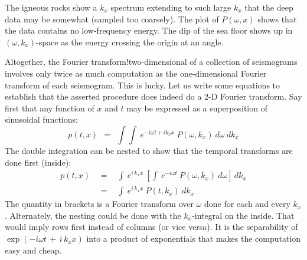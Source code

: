 The igneous rocks show a  $k_x$  spectrum
extending to such large  $k_x$  that the deep data may be somewhat
(sampled too coarsely).
The plot of  $P( \omega , x)$  shows that the data contains no
low-frequency energy.
The dip of the sea floor shows up in  $( \omega , k_x )$-space as
the energy crossing the origin at an angle.
\par
Altogether, the
    {Fourier transform!two-dimensional}
of a collection of seismograms
involves only twice as much computation as the one-dimensional
Fourier transform of each seismogram.
This is lucky.
Let us write some equations to establish that the asserted procedure
does indeed do a 2-D Fourier transform.
Say first that any function of  $x$  and  $t$  may
be expressed as a superposition of sinusoidal functions:
\begin{equation}
p(t , x) \ \ =\ \  \int \int \  e^{ -i \omega t + i k_x x } \ 
P( \omega , k_x ) \  d \omega \  d k_x 
\label{eqn:2.9}
\end{equation}
The double integration can be nested to show
that the temporal transforms are done first (inside):
\begin{eqnarray*}
p(t , x) \ \ &=&\ \  \int \  e^{ i \,k_x x } \  \left[ \int \ 
e^{ -i \omega t } \  P ( \omega , k_x ) \  d \omega \right]\,dk_x
\\
 \ \ &=&\ \ 
\int \  e^{ i \,k_x x } \  P(t ,  k_x ) \  dk_x
\end{eqnarray*}
The quantity in brackets is a Fourier transform over  $\omega$  done
for each and every  $ k_x $.
Alternately, the nesting could be done with the $ k_x $-integral
on the inside.
That would imply rows first instead of columns (or vice versa).
It is the separability of  $\exp (-i \omega t \,+\, i\, k_x x ) $  into a
product of exponentials that makes the computation easy and cheap.
